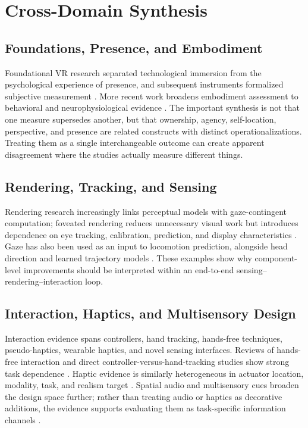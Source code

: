 \section{Cross-Domain Synthesis}
\subsection{Foundations, Presence, and Embodiment}
Foundational VR research separated technological immersion from the psychological experience of presence, and subsequent instruments formalized subjective measurement \cite{Slater2009PlaceIllusion,Witmer1998Presence,Cummings2016ImmersionPresence}. More recent work broadens embodiment assessment to behavioral and neurophysiological evidence \cite{EmbodimentEEG2025,Khanna2025PerspectiveTaking}. The important synthesis is not that one measure supersedes another, but that ownership, agency, self-location, perspective, and presence are related constructs with distinct operationalizations. Treating them as a single interchangeable outcome can create apparent disagreement where the studies actually measure different things.

\subsection{Rendering, Tracking, and Sensing}
Rendering research increasingly links perceptual models with gaze-contingent computation; foveated rendering reduces unnecessary visual work but introduces dependence on eye tracking, calibration, prediction, and display characteristics \cite{Wang2023FoveatedSurvey,Kim2024IndividualizedFoveated,EyeTrackingBroad2023}. Gaze has also been used as an input to locomotion prediction, alongside head direction and learned trajectory models \cite{Gandrud2016Destination,Bremer2021FuturePosition,Stein2022EyeLSTM}. These examples show why component-level improvements should be interpreted within an end-to-end sensing--rendering--interaction loop.

\subsection{Interaction, Haptics, and Multisensory Design}
Interaction evidence spans controllers, hand tracking, hands-free techniques, pseudo-haptics, wearable haptics, and novel sensing interfaces. Reviews of hands-free interaction and direct controller-versus-hand-tracking studies show strong task dependence \cite{Monteiro2021HandsFree,SteedLai2025HandTracking}. Haptic evidence is similarly heterogeneous in actuator location, modality, task, and realism target \cite{Frisoli2024WearableHaptics,Shi2024HapticSensing}. Spatial audio and multisensory cues broaden the design space further; rather than treating audio or haptics as decorative additions, the evidence supports evaluating them as task-specific information channels \cite{Almeida2024SpatialAudio}.

